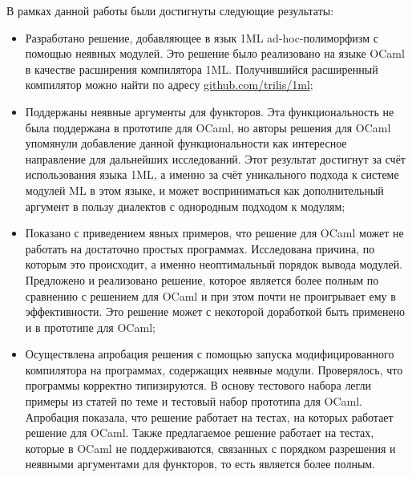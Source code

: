 \documentclass[../diploma.tex]{subfiles}
\begin{document}
В рамках данной работы были достигнуты следующие результаты: 

\begin{itemize}
	\item Разработано решение, добавляющее в язык 1ML ad-hoc-полиморфизм с помощью неявных модулей. Это решение было реализовано на языке OCaml в качестве расширения компилятора 1ML. Получившийся расширенный компилятор можно найти по адресу \href{https://github.com/trilis/1ml}{github.com/trilis/1ml};
	\item Поддержаны неявные аргументы для функторов. Эта функциональность не была поддержана в прототипе для OCaml, но авторы решения для OCaml упомянули добавление данной функциональности как интересное направление для дальнейших исследований. Этот результат достигнут за счёт использования языка 1ML, а именно за счёт уникального подхода к системе модулей ML в этом языке, и может восприниматься как дополнительный аргумент в пользу диалектов с однородным подходом к модулям;
	\item Показано с приведением явных примеров, что решение для OCaml может не работать на достаточно простых программах. Исследована причина, по которым это происходит, а именно неоптимальный порядок вывода модулей. Предложено и реализовано решение, которое является более полным по сравнению с решением для OCaml и при этом почти не проигрывает ему в эффективности. Это решение может с некоторой доработкой быть применено и в прототипе для OCaml;
	\item Осуществлена апробация решения с помощью запуска модифицированного компилятора на программах, содержащих неявные модули. Проверялось, что программы корректно типизируются. В основу тестового набора легли примеры из статей по теме и тестовый набор прототипа для OCaml. Апробация показала, что решение работает на тестах, на которых работает решение для OCaml. Также предлагаемое решение работает на тестах, которые в OCaml не поддерживаются, связанных с порядком разрешения и неявными аргументами для функторов, то есть является более полным.
\end{itemize}
\end{document}
